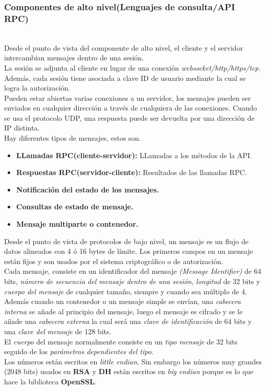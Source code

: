 \subsubsection{Componentes de alto nivel(Lenguajes de consulta/API RPC)}\\
Desde el punto de vista del componente de alto nivel, el cliente y el servidor intercambian mensajes dentro de una sesión.\\
La sesión se adjunta al cliente en lugar de una conexión \emph{websocket/http/https/tcp.} 
Además, cada sesión tiene asociada a clave ID de usuario mediante la cual se logra la autorización.\\ 
Pueden estar abiertas varias conexiones a un servidor, los mensajes pueden ser enviados en cualquier dirección a través de cualquiera de las conexiones.
Cuando se usa el protocolo UDP, una respuesta puede ser devuelta por una dirección de IP distinta.\\
Hay diferentes tipos de mensajes, estos son.
\begin{itemize}
		\item \textbf{LLamadas RPC(cliente-servidor):} LLamadas a los métodos de la API.
		\item \textbf{Respuestas RPC(servidor-cliente):} Resultados de las llamadas RPC.
		\item \textbf{Notificación del estado de los mensajes.}
		\item \textbf{Consultas de estado de mensaje.}
		\item \textbf{Mensaje multiparte o contenedor.}
\end{itemize}
Desde el punto de vista de protocolos de bajo nivel, un mensaje es un flujo de datos alineados con 4 ó 16 bytes de límite.
Los primeros campos en un mensaje están fijos y son usados por el sistema criptográfico o de autorización.\\
Cada mensaje, consiste en un identificador del mensaje \emph{(Message Identifier)} de 64 bits, \emph{número de secuencia del mensaje dentro de una sesión}, \emph{longitud} de 32 bits y \emph{cuerpo del mensaje} de cualquier tamaño, siempre y cuando sea múltiplo de 4. 
Además cuando un contenedor o un mensaje simple se envían, una \emph{cabecera interna} se añade al principio del mensaje, luego el mensaje es cifrado y se le añade una \emph{cabecera externa} la cual será una \emph{clave de identificación} de 64 bits y una \emph{clave del mensaje} de 128 bits.\\
El \emph{cuerpo} del mensaje normalmente consiste en un \emph{tipo mensaje} de 32 bits seguido de los \emph{parámetros dependientes del tipo}.\\
Los números están escritos en \emph{little endian}. Sin embargo los números muy grandes (2048 bits) usados en \textbf{RSA} y \textbf{DH} están escritos en \emph{big endian} porque es lo que hace la biblioteca \textbf{OpenSSL}.\\

